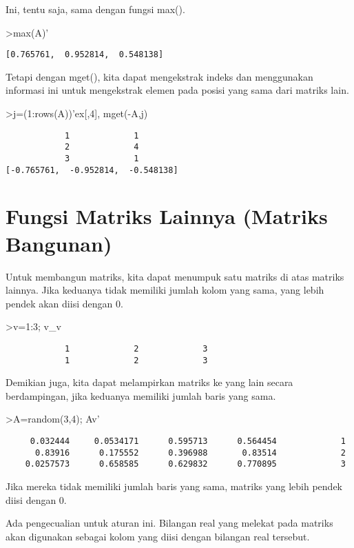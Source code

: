\documentclass[
]{book}
\begin{document}
Ini, tentu saja, sama dengan fungsi max().

\textgreater max(A)'

\begin{verbatim}
[0.765761,  0.952814,  0.548138]
\end{verbatim}

Tetapi dengan mget(), kita dapat mengekstrak indeks dan menggunakan informasi ini untuk mengekstrak elemen pada posisi yang sama dari matriks lain.

\textgreater j=(1:rows(A))'\textbar ex{[},4{]}, mget(-A,j)

\begin{verbatim}
            1             1 
            2             4 
            3             1 
[-0.765761,  -0.952814,  -0.548138]
\end{verbatim}

\chapter{Fungsi Matriks Lainnya (Matriks Bangunan)}\label{fungsi-matriks-lainnya-matriks-bangunan}

Untuk membangun matriks, kita dapat menumpuk satu matriks di atas matriks lainnya. Jika keduanya tidak memiliki jumlah kolom yang sama, yang lebih pendek akan diisi dengan 0.

\textgreater v=1:3; v\_v

\begin{verbatim}
            1             2             3 
            1             2             3 
\end{verbatim}

Demikian juga, kita dapat melampirkan matriks ke yang lain secara berdampingan, jika keduanya memiliki jumlah baris yang sama.

\textgreater A=random(3,4); A\textbar v'

\begin{verbatim}
     0.032444     0.0534171      0.595713      0.564454             1 
      0.83916      0.175552      0.396988       0.83514             2 
    0.0257573      0.658585      0.629832      0.770895             3 
\end{verbatim}

Jika mereka tidak memiliki jumlah baris yang sama, matriks yang lebih pendek diisi dengan 0.

Ada pengecualian untuk aturan ini. Bilangan real yang melekat pada matriks akan digunakan sebagai kolom yang diisi dengan bilangan real tersebut.
\end{document}
